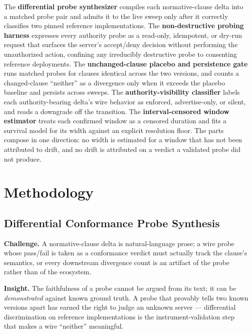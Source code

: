 \documentclass[11pt]{article}
\begin{document}
The \textbf{differential probe synthesizer} compiles each normative-clause delta into a matched probe pair and admits it to the live sweep only after it correctly classifies two pinned reference implementations. The \textbf{non-destructive probing harness} expresses every authority probe as a read-only, idempotent, or dry-run request that surfaces the server's accept/deny decision without performing the unauthorized action, confining any irreducibly destructive probe to consenting reference deployments. The \textbf{unchanged-clause placebo and persistence gate} runs matched probes for clauses identical across the two versions, and counts a changed-clause ``neither'' as a divergence only when it exceeds the placebo baseline and persists across sweeps. The \textbf{authority-visibility classifier} labels each authority-bearing delta's wire behavior as enforced, advertise-only, or silent, and reads a downgrade off the transition. The \textbf{interval-censored window estimator} treats each confirmed window as a censored duration and fits a survival model for its width against an explicit resolution floor. The parts compose in one direction: no width is estimated for a window that has not been attributed to drift, and no drift is attributed on a verdict a validated probe did not produce.

\section{Methodology}

\subsection{Differential Conformance Probe Synthesis}

\textbf{Challenge.} A normative-clause delta is natural-language prose; a wire probe whose pass/fail is taken as a conformance verdict must actually track the clause's semantics, or every downstream divergence count is an artifact of the probe rather than of the ecosystem.

\textbf{Insight.} The faithfulness of a probe cannot be argued from its text; it can be \emph{demonstrated} against known ground truth. A probe that provably tells two known versions apart has earned the right to judge an unknown server --- differential discrimination on reference implementations is the instrument-validation step that makes a wire ``neither'' meaningful.
\end{document}
